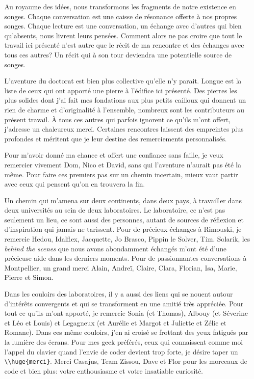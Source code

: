 Au royaume des idées, nous transformons les fragments de notre existence
en songes. Chaque conversation est une caisse de résonance offerte à nos
propres songes. Chaque lecture est une conversation, un échange avec
d'autres qui bien qu'absents, nous livrent leurs pensées. Comment alors
ne pas croire que tout le travail ici présenté n'est autre que le récit
de ma rencontre et des échanges avec tous ces autres? Un récit qui à son
tour deviendra une potentielle source de songes.

L'aventure du doctorat est bien plus collective qu'elle n'y parait.
Longue est la liste de ceux qui ont apporté une pierre à l'édifice ici
présenté. Des pierres les plus solides dont j'ai fait mes fondations aux
plus petits cailloux qui donnent un rien de charme et d'originalité à
l'ensemble, nombreux sont les contributeurs au présent travail. À tous
ces autres qui parfois ignorent ce qu'ils m'ont offert, j'adresse un
chaleureux merci. Certaines rencontres laissent des empreintes plus
profondes et méritent que je leur destine des remerciements
personnalisés.

Pour m'avoir donné ma chance et offert une confiance sans faille, je
veux remercier vivement Dom, Nico et David, sans qui l'aventure n'aurait
pas été la même. Pour faire ces premiers pas sur un chemin incertain,
mieux vaut partir avec ceux qui pensent qu'on en trouvera la fin.

Un chemin qui m'amena sur deux continents, dans deux pays, à travailler
dans deux universités au sein de deux laboratoires. Le laboratoire, ce
n'est pas seulement un lieu, ce sont aussi des personnes, autant de
sources de réflexion et d'inspiration qui jamais ne tarissent. Pour de
précieux échanges à Rimouski, je remercie Hedou, Idalflex, Jacquette, Jo
Brasco, Pippin le Solver, Tim. Solarik, les \emph{behind the scenes} que
nous avons abondamment échangés m'ont été d'une précieuse aide dans les
derniers moments. Pour de passionnantes conversations à Montpellier, un
grand merci Alain, Andreï, Claire, Clara, Florian, Isa, Marie, Pierre et
Simon.

Dans les couloirs des laboratoires, il y a aussi des liens qui se nouent
autour d'intérêts convergents et qui se transforment en une amitié très
appréciée. Pour tout ce qu'ils m'ont apporté, je remercie Sonia (et
Thomas), Albouy (et Séverine et Léo et Louis) et Legagneux (et Aurélie
et Margot et Juliette et Zélie et Romane). Dans ces même couloirs, j'en
ai croisé se frottant des yeux fatigués par la lumière des écrans. Pour
mes geek préférés, ceux qui connaissent comme moi l'appel du clavier
quand l'envie de coder devient trop forte, je désire taper un
\texttt{\textbackslash{}\textbackslash{}huge\{merci\}}. Merci Casajus,
Team Zissou, Dave et Flor pour les morceaux de code et bien plus: votre
enthousiasme et votre insatiable curiosité.

